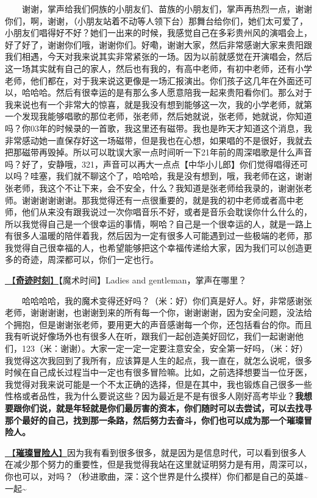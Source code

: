 \documentclass[]{ctexbook}
\begin{document}
  谢谢，掌声给我们侗族的小朋友们、苗族的小朋友们，掌声再热烈一点，谢谢你们，啊，谢谢，（小朋友站着不动等人领下台）那舞台给你们，她们太可爱了，小朋友们唱得好不好？她们一出来的时候，我感觉自己在多彩贵州风的演唱会上，好了好了，谢谢你们哦，谢谢你们。好嘞，谢谢大家，然后非常感谢大家来贵阳跟我们相遇，今天对我来说其实非常紧张的一场。因为以前就感觉在开演唱会，然后这一场其实就有自己的家人，然后也有我的，有高中老师，有初中老师，还有小学老师，他们都在，对于我来说这更像是一场汇报演出。你们孩子这几年在外面还可以，哈哈哈。然后有很幸运的是有那么多人愿意陪我一起来贵阳看你们。那么对于我来说也有一个非常大的惊喜，就是我没有想到能够这一次，我的小学老师，就第一个发现我能够唱歌的那位老师，张老师，然后她就说，张老师，她就说，你知道吗？你03年的时候录的一首歌，我这里还有磁带。我也是昨天才知道这个消息，我非常感动她一直保存好这一场磁带，但是我也在心想，如果唱的不是很好，我就去把那磁带再毁掉。所以可以耽误大家一点时间听一下21年前的周深唱歌是什么声音吗？好了，安静哦，321，声音可以再大一点点【中华小儿郎】你们觉得唱得还可以吗？哇塞，我们就不聊这个了，哈哈哈，我是没有想到，哦，我老师在这，谢谢张老师，我这个不让下来，会不安全，什么？我知道是张老师给我录的，谢谢张老师。谢谢谢谢谢谢。那我觉得还有一点很重要的，就是我的初中老师或者高中老师，他们从来没有跟我说过一次你唱音乐不好，或者是音乐会耽误你什么什么的，所以我觉得自己是一个很幸运的事情，啊哈？自己是一个很幸运的人，就是一路上有很多人温暖的陪伴着我，然后因为一定有很多人可能遇到过一些极端的老师，那我觉得自己很幸福的人，也希望能够把这个幸福传递给大家，因为我们可以创造更多的奇迹，周深都可以，你们一定也行。

\hyperref[magic-moment]{🎵【\textbf{奇迹时刻}】}【魔术时间】Ladies and gentleman，掌声在哪里？

  哈哈哈哈，我的魔术变得还好吗？（米：好）你们真是好人。好，非常感谢张老师，谢谢谢谢，也谢谢到来的所有每一个你，谢谢谢谢，因为安全问题，没法给个拥抱，但是谢谢张老师，要用更大的声音感谢每一个你，还包括看台的你。而且我有听说好像场外也有很多人在听，跟我们一起创造美好回忆，我们一起谢谢他们，123（米：谢谢）。大家一定一定一定要注意安全，安全第一好吗，（米：好）我觉得这次我回到了我所有，应该算是人生的起点，我一直在，就怎么说呢，很多时候在自己成长过程当中一定也有很多冒险嘛。比如，之前选择想要当一位牙医，我觉得对我来说可能是一个不太正确的选择，但是在其中，我也锻炼自己很多一些性格或者品性，我为什么要说这些？因为最近是不是有很多人刚好高考毕业？\textbf{我想要跟你们说，就是年轻就是你们最厉害的资本，你们随时可以去尝试，可以去找寻那个最好的自己，找到那一条路，然后努力去奋斗，你们也可以成为那一个璀璨冒险人。}

\hyperref[adventurers]{🎵【\textbf{璀璨冒险人}】}因为我有看到很多很多，就是因为是信息时代，可以看到很多人在减少那个努力的重要性，但是我觉得我站在这里就证明努力是有用，周深可以，你也可以，对吗？（秒进歌曲，深：这个世界是什么摸样）你们都是自己的英雄\textasciitilde 一起\textasciitilde{}
\end{document}
